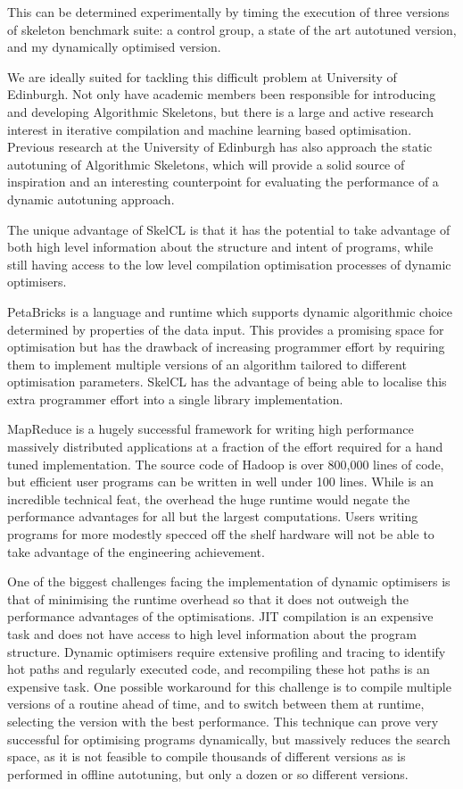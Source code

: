 This can be determined experimentally by timing the execution of three
versions of skeleton benchmark suite: a control group, a state of the
art autotuned version, and my dynamically optimised version.


We are ideally suited for tackling this difficult problem at
University of Edinburgh. Not only have academic members been
responsible for introducing and developing Algorithmic Skeletons, but
there is a large and active research interest in iterative compilation
and machine learning based optimisation. Previous research at the
University of Edinburgh has also approach the static autotuning of
Algorithmic Skeletons, which will provide a solid source of
inspiration and an interesting counterpoint for evaluating the
performance of a dynamic autotuning approach.

\newpage
The unique advantage of SkelCL is that it has the potential to take
advantage of both high level information about the structure and
intent of programs, while still having access to the low level
compilation optimisation processes of dynamic optimisers.

PetaBricks is a language and runtime which supports dynamic
algorithmic choice determined by properties of the data input. This
provides a promising space for optimisation but has the drawback of
increasing programmer effort by requiring them to implement multiple
versions of an algorithm tailored to different optimisation
parameters. SkelCL has the advantage of being able to localise this
extra programmer effort into a single library implementation.

MapReduce is a hugely successful framework for writing high
performance massively distributed applications at a fraction of the
effort required for a hand tuned implementation. The source code of
Hadoop is over 800,000 lines of code, but efficient user programs can
be written in well under 100 lines. While is an incredible technical
feat, the overhead the huge runtime would negate the performance
advantages for all but the largest computations. Users writing
programs for more modestly specced off the shelf hardware will not be
able to take advantage of the engineering achievement.

One of the biggest challenges facing the implementation of dynamic
optimisers is that of minimising the runtime overhead so that it does
not outweigh the performance advantages of the optimisations. JIT
compilation is an expensive task and does not have access to high
level information about the program structure. Dynamic optimisers
require extensive profiling and tracing to identify hot paths and
regularly executed code, and recompiling these hot paths is an
expensive task. One possible workaround for this challenge is to
compile multiple versions of a routine ahead of time, and to switch
between them at runtime, selecting the version with the best
performance. This technique can prove very successful for optimising
programs dynamically, but massively reduces the search space, as it is
not feasible to compile thousands of different versions as is
performed in offline autotuning, but only a dozen or so different
versions.

